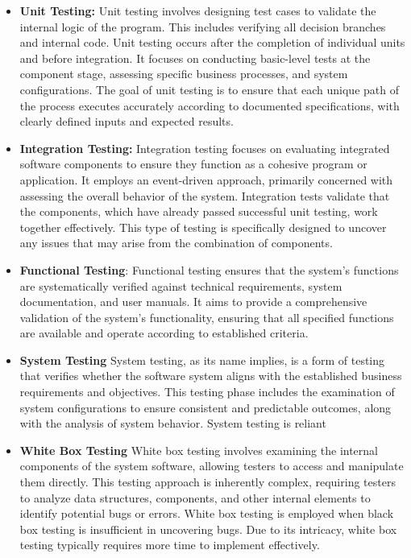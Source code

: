 \documentclass[12pt,a4paper]{report}
\begin{document}
\begin{itemize}
    \item \textbf{Unit Testing:}
          Unit testing involves designing test cases to validate the internal logic of the program. This includes verifying all decision branches and internal code. Unit testing occurs after the completion of individual units and before integration. It focuses on conducting basic-level tests at the component stage, assessing specific business processes, and system configurations. The goal of unit testing is to ensure that each unique path of the process executes accurately according to documented specifications, with clearly defined inputs and expected results.
    \item \textbf{Integration Testing:}
          Integration testing focuses on evaluating integrated software components to ensure they function as a cohesive program or application. It employs an event-driven approach, primarily concerned with assessing the overall behavior of the system. Integration tests validate that the components, which have already passed successful unit testing, work together effectively. This type of testing is specifically designed to uncover any issues that may arise from the combination of components.
    \item \textbf{Functional Testing}:
          Functional testing ensures that the system's functions are systematically verified against technical requirements, system documentation, and user manuals. It aims to provide a comprehensive validation of the system's functionality, ensuring that all specified functions are available and operate according to established criteria.
    \item \textbf{System Testing}
          System testing, as its name implies, is a form of testing that verifies whether the software system aligns with the established business requirements and objectives. This testing phase includes the examination of system configurations to ensure consistent and predictable outcomes, along with the analysis of system behavior. System testing is reliant
    \item \textbf{White Box Testing}
          White box testing involves examining the internal components of the system software, allowing testers to access and manipulate them directly. This testing approach is inherently complex, requiring testers to analyze data structures, components, and other internal elements to identify potential bugs or errors. White box testing is employed when black box testing is insufficient in uncovering bugs. Due to its intricacy, white box testing typically requires more time to implement effectively.

\end{itemize}
\end{document}
